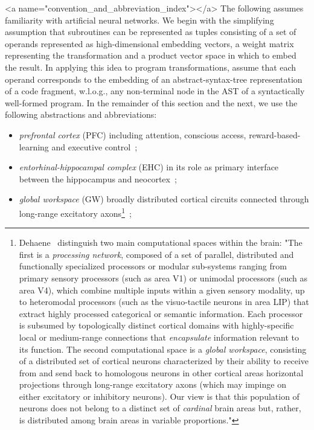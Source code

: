 \rawhtml
<a name="convention_and_abbreviation_index"></a>
\endrawhtml
The following assumes familiarity with artificial neural networks. We begin with the simplifying assumption that subroutines can be represented as tuples consisting of a set of operands represented as high-dimensional embedding vectors, a weight matrix representing the transformation and a product vector space in which to embed the result. In applying this idea to program transformations, assume that each operand corresponds to the embedding of an abstract-syntax-tree representation of a code fragment, w.l.o.g., any non-terminal node in the AST of a syntactically well-formed program. In the remainder of this section and the next, we use the following abstractions and abbreviations:
%
\begin{itemize}
%
\item {\it{prefrontal cortex}} (PFC) including attention, conscious access, reward-based-learning and executive control~\cite{WangetalNATURE-NEUROSCIENCE-18,KrieteetalPNAS-13};
%
\item {\it{entorhinal-hippocampal complex}} (EHC) in its role as primary interface between the hippocampus and neocortex~\cite{OReillyetalCS-15,OReillySCIENCE-06};
%
\item {\it{global workspace}} (GW) broadly distributed cortical circuits connected through long-range excitatory axons\footnote{%
%
    Dehaene~ distinguish two main computational spaces within the brain: "The first is a {\it{processing network}}, composed of a set of parallel, distributed and functionally specialized processors or modular sub-systems ranging from primary sensory processors (such as area V1) or unimodal processors (such as area V4), which combine multiple inputs within a given sensory modality, up to heteromodal processors (such as the visuo-tactile neurons in area LIP) that extract highly processed categorical or semantic information. Each processor is subsumed by topologically distinct cortical domains with highly-specific local or medium-range connections that {\it{encapsulate}} information relevant to its function. The second computational space is a {\it{global workspace}}, consisting of a distributed set of cortical neurons characterized by their ability to receive from and send back to homologous neurons in other cortical areas horizontal projections through long-range excitatory axons (which may impinge on either excitatory or inhibitory neurons). Our view is that this population of neurons does not belong to a distinct set of {\it{cardinal}} brain areas but, rather, is distributed among brain areas in variable proportions."}~\cite{DehaeneetalPNAS-98};

\end{itemize}
